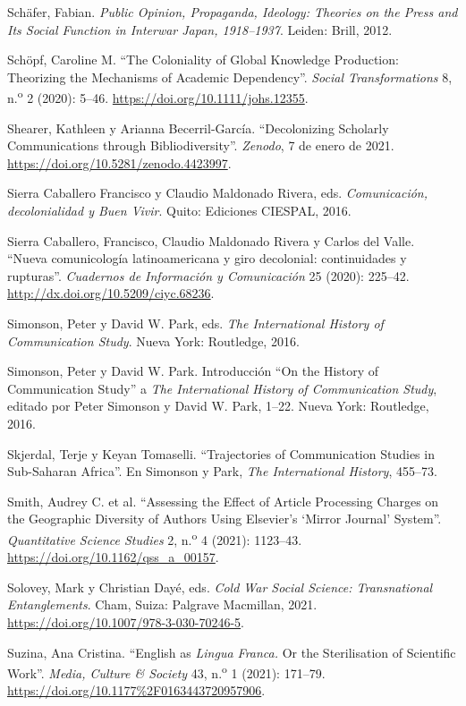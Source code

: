 \documentclass{tufte-handout}
\begin{document}
\begin{hangparas}{.25in}{1}
Schäfer, Fabian. \emph{Public Opinion, Propaganda, Ideology: Theories on
the Press and Its Social Function in Interwar Japan, 1918--1937}.
Leiden: Brill, 2012.

Schöpf, Caroline M. ``The Coloniality of Global Knowledge Production:
Theorizing the Mechanisms of Academic Dependency''. \emph{Social
Transformations} 8, n.\textsuperscript{o} 2 (2020): 5--46.
\url{https://doi.org/10.1111/johs.12355}.

Shearer, Kathleen y Arianna Becerril-García. ``Decolonizing Scholarly
Communications through Bibliodiversity''. \emph{Zenodo}, 7 de enero de
2021. \url{https://doi.org/10.5281/zenodo.4423997}.

Sierra Caballero Francisco y Claudio Maldonado Rivera, eds.
\emph{Comunicación, decolonialidad y Buen Vivir}. Quito: Ediciones
CIESPAL, 2016.

Sierra Caballero, Francisco, Claudio Maldonado Rivera y Carlos del
Valle. ``Nueva comunicología latinoamericana y giro decolonial:
continuidades y rupturas''. \emph{Cuadernos de Información y
Comunicación} 25 (2020): 225--42.
\url{http://dx.doi.org/10.5209/ciyc.68236}.

Simonson, Peter y David W. Park, eds. \emph{The International History of
Communication Study}. Nueva York: Routledge, 2016.

Simonson, Peter y David W. Park. Introducción ``On the History of
Communication Study'' a \emph{The International History of Communication
Study}, editado por Peter Simonson y David W. Park, 1--22. Nueva York:
Routledge, 2016.

Skjerdal, Terje y Keyan Tomaselli. ``Trajectories of Communication
Studies in Sub-Saharan Africa''. En Simonson y Park, \emph{The
International History}, 455--73.

Smith, Audrey C. et al. ``Assessing the Effect of Article Processing
Charges on the Geographic Diversity of Authors Using Elsevier's `Mirror
Journal' System''. \emph{Quantitative Science Studies} 2,
n.\textsuperscript{o} 4 (2021): 1123--43.
\url{https://doi.org/10.1162/qss_a_00157}.

Solovey, Mark y Christian Dayé, eds. \emph{Cold War Social Science:
Transnational Entanglements}. Cham, Suiza: Palgrave Macmillan, 2021.
\url{https://doi.org/10.1007/978-3-030-70246-5}.

Suzina, Ana Cristina. ``English as \emph{Lingua Franca.} Or the
Sterilisation of Scientific Work''. \emph{Media, Culture \& Society} 43,
n.\textsuperscript{o} 1 (2021): 171--79.
\url{https://doi.org/10.1177\%2F0163443720957906}.


\end{hangparas}
\end{document}

